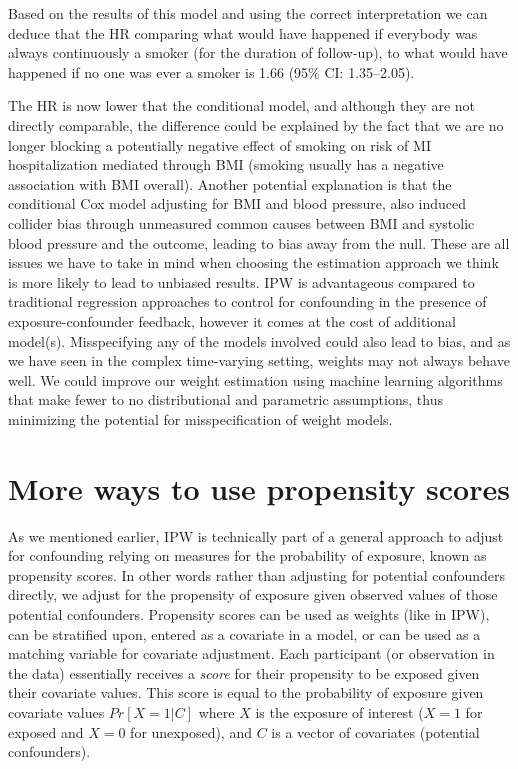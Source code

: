 \documentclass[
]{book}
\begin{document}
Based on the results of this model and using the correct interpretation we can deduce that the HR comparing what would have happened if everybody was always continuously a smoker (for the duration of follow-up), to what would have happened if no one was ever a smoker is 1.66 (95\% CI: 1.35--2.05).

The HR is now lower that the conditional model, and although they are not directly comparable, the difference could be explained by the fact that we are no longer blocking a potentially negative effect of smoking on risk of MI hospitalization mediated through BMI (smoking usually has a negative association with BMI overall). Another potential explanation is that the conditional Cox model adjusting for BMI and blood pressure, also induced collider bias through unmeasured common causes between BMI and systolic blood pressure and the outcome, leading to bias away from the null. These are all issues we have to take in mind when choosing the estimation approach we think is more likely to lead to unbiased results. IPW is advantageous compared to traditional regression approaches to control for confounding in the presence of exposure-confounder feedback, however it comes at the cost of additional model(s). Misspecifying any of the models involved could also lead to bias, and as we have seen in the complex time-varying setting, weights may not always behave well. We could improve our weight estimation using machine learning algorithms that make fewer to no distributional and parametric assumptions, thus minimizing the potential for misspecification of weight models.

\section{More ways to use propensity scores}\label{more-ways-to-use-propensity-scores}

As we mentioned earlier, IPW is technically part of a general approach to adjust for confounding relying on measures for the probability of exposure, known as propensity scores. In other words rather than adjusting for potential confounders directly, we adjust for the propensity of exposure given observed values of those potential confounders. Propensity scores can be used as weights (like in IPW), can be stratified upon, entered as a covariate in a model, or can be used as a matching variable for covariate adjustment. Each participant (or observation in the data) essentially receives a \emph{score} for their propensity to be exposed given their covariate values. This score is equal to the probability of exposure given covariate values \(Pr[X=1|C]\) where \(X\) is the exposure of interest (\(X=1\) for exposed and \(X=0\) for unexposed), and \(C\) is a vector of covariates (potential confounders).
\end{document}
